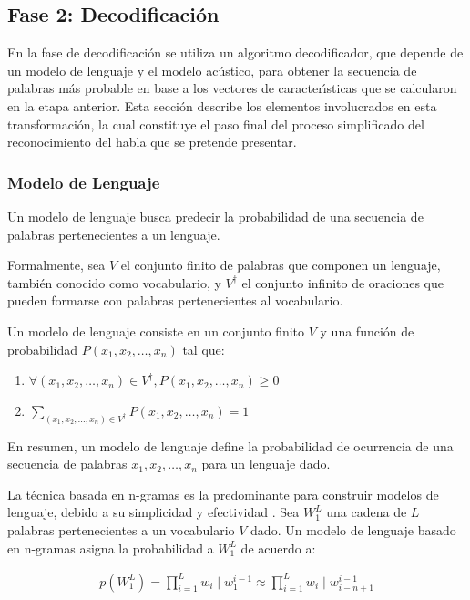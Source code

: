 \subsection{Fase 2: Decodificaci\'on}
\label{sec:decoding}

En la fase de decodificaci\'on se utiliza un algoritmo decodificador, que depende de un modelo de lenguaje 
y el modelo ac\'ustico, para obtener la secuencia de palabras m\'as probable en base a los vectores 
de caracter{\'\i}sticas que se calcularon en la etapa anterior. 
Esta secci\'on describe los elementos involucrados en esta transformaci\'on, la cual constituye el paso
final del proceso simplificado del reconocimiento del habla que se pretende presentar.

\subsubsection{Modelo de Lenguaje}
Un modelo de lenguaje busca predecir la probabilidad de una secuencia de palabras pertenecientes a un lenguaje.

Formalmente, sea $V$ el conjunto finito de palabras que componen un lenguaje, tambi\'en conocido como 
vocabulario, y $V^\dag$ el conjunto infinito de oraciones que pueden formarse con palabras pertenecientes 
al vocabulario.

Un modelo de lenguaje \cite{CollinsLanguage} consiste en un conjunto finito $V$ y una funci\'on 
de probabilidad $P(x_1,x_2,\ldots,x_n)$ tal que:
\begin{enumerate}

\item $\forall (x_1,x_2,\ldots,x_n) \in V^\dag, P(x_1,x_2,\ldots,x_n) \ge 0$

\item $\displaystyle \sum_{(x_1,x_2,\ldots,x_n) \in V^\dag} P(x_1,x_2,\ldots,x_n) = 1$
\end{enumerate}


En resumen, un modelo de lenguaje define la probabilidad de ocurrencia de una secuencia de palabras
$x_1,x_2,\ldots,x_n$ para un lenguaje dado.

La t\'ecnica basada en n-gramas es la predominante para construir modelos de lenguaje, 
debido a su simplicidad y efectividad \cite{GaoComparative2010}.
Sea $W^L_1$ una cadena de $L $ palabras pertenecientes a un vocabulario $V$ dado. 
Un modelo de lenguaje basado en n-gramas asigna la probabilidad a $W^L_1$ de acuerdo a:

\begin{align}
p(W^L_1) = \displaystyle \prod^L_{i = 1} w_i \mid w^{i - 1}_1 \approx \displaystyle \prod^L_{i = 1} w_i \mid w^{i - 1}_{i - n + 1}
\end{align}

